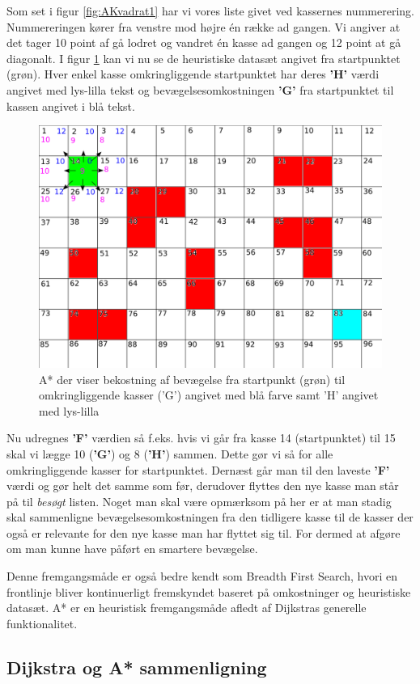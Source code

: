 Som set i figur \ref{fig:AKvadrat1} har vi vores liste givet ved kassernes nummerering. Nummereringen kører fra venstre mod højre én række ad gangen. Vi angiver at det tager 10 point af gå lodret og vandret én kasse ad gangen og 12 point at gå diagonalt. I figur \ref{fig:AKvadrat2} kan vi nu se de heuristiske datasæt angivet fra startpunktet (grøn). Hver enkel kasse omkringliggende startpunktet har deres \textbf{'H'} værdi angivet med lys-lilla tekst og bevægelsesomkostningen \textbf{'G'} fra startpunktet til kassen angivet i blå tekst.

\begin{figure}[ht!]
\begin{center}
\includegraphics[width=1.00\textwidth]{Pictures/Teoriafsnit/Figurfiler/Grid3.png}
\end{center}
\label{fig:AKvadrat2}
\caption{A* der viser bekostning af bevægelse fra startpunkt (grøn) til omkringliggende kasser ('G') angivet med blå farve samt 'H' angivet med lys-lilla}
\end{figure}

Nu udregnes \textbf{'F'} værdien så f.eks. hvis vi går fra kasse 14 (startpunktet) til 15 skal vi lægge 10 (\textbf{'G'}) og 8 (\textbf{'H'}) sammen. Dette gør vi så for alle omkringliggende kasser for startpunktet. Dernæst går man til den laveste \textbf{'F'} værdi og gør helt det samme som før, derudover flyttes den nye kasse man står på til \textit{besøgt} listen. Noget man skal være opmærksom på her er at man stadig skal sammenligne bevægelsesomkostningen fra den tidligere kasse til de kasser der også er relevante for den nye kasse man har flyttet sig til. For dermed at afgøre om man kunne have påført en smartere bevægelse.

Denne fremgangsmåde er også bedre kendt som Breadth First Search, hvori en frontlinje bliver kontinuerligt fremskyndet baseret på omkostninger og heuristiske datasæt\cite{stanfordredblobgamesAstar}.
A* er en heuristisk fremgangsmåde afledt af Dijkstras generelle funktionalitet. %


\subsection{Dijkstra og A* sammenligning}
